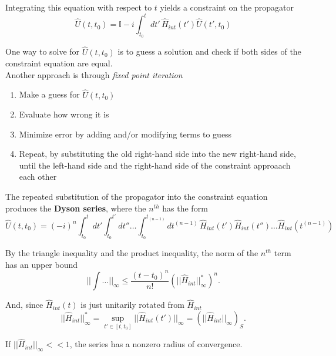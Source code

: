 \noindent Integrating this equation with respect to $t$ yields a constraint on the propagator
\begin{equation}
\hat{U}(t,t_0) = \mathbb{I} - i \int_{t_0}^t dt' \, \hat{H}_{int} (t') \hat{U}(t',t_0)
\end{equation}

\noindent One way to solve for $\hat{U}(t,t_0)$ is to guess a solution and check if both sides of the constraint equation are equal. \\

\noindent Another approach is through \textit{fixed point iteration}
\begin{enumerate}
\item Make a guess for $\hat{U}(t,t_0)$
\item Evaluate how wrong it is
\item Minimize error by adding and/or modifying terms to guess
\item Repeat, by substituting the old right-hand side into the new right-hand side, until the left-hand side and the right-hand side of the constraint approaach each other
\end{enumerate}

\noindent The repeated substitution of the propagator into the constraint equation produces the \textbf{Dyson series}, where the $n^{th}$ has the form
\begin{equation}
\hat{U}(t,t_0) = (-i)^n \int^t_{t_0} dt' \int^{t'}_{t_0} dt'' \dots \int^{t_{(n-1)}}_{t_0} dt^{(n-1)} \, \hat{H}_{int}(t') \hat{H}_{int}(t'') \dots \hat{H}_{int}(t^{(n-1)})
\end{equation}

\noindent By the triangle inequality and the product inequality, the norm of the $n^{th}$ term has an upper bound
\begin{equation}
|| \int \dots ||_{\infty} \le \frac{(t-t_0)^n}{n!} (|| \hat{H}_{int} ||_\infty^*)^n .
\end{equation}

\noindent And, since $\hat{H}_{int}(t)$ is just unitarily rotated from $\hat{H}_{int}$
\begin{equation}
|| \hat{H}_{int} ||_\infty^* = \sup_{t' \in [t,t_0]} || \hat{H}_{int}(t') ||_\infty = (||\hat{H}_{int}||_\infty)_S .
\end{equation}

\noindent If $||\hat{H}_{int}||_\infty << 1$, the series has a nonzero radius of convergence. \\

